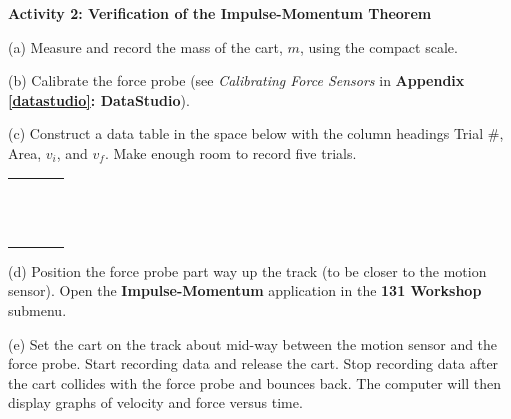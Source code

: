 \vspace{0.3cm}
{\par\centering {} \par}
\vspace{0.3cm}

\textbf{Activity  2: Verification of the Impulse-Momentum Theorem} 

(a) Measure and record the mass of the cart, $m$, using the compact scale.
\vspace{10mm}

(b) Calibrate the force probe (see \textit{Calibrating Force Sensors} in \textbf{Appendix \ref{datastudio}: DataStudio}). 

(c) Construct a data table in the space below with the column headings Trial
\#, Area, \( v_{i} \), and \( v_{f} \). Make enough room to record five trials.

\begin{center}
\begin{tabular}{|p{1.0in}|p{1.0in}|p{1.0in}|p{1.0in}|} \hline
 & & & \\ \hline
 & & & \\
 & & & \\
 & & & \\
 & & & \\
 & & & \\
 & & & \\
 & & & \\
 & & & \\
 & & & \\
 & & & \\
 & & & \\
 & & & \\
 & & & \\ \hline
\end{tabular}
\end{center}

(d) Position the force probe part way up the track (to be closer to the motion sensor). Open the \textbf{Impulse-Momentum} application in the \textbf{131 Workshop} submenu. 

(e) Set the cart on the track about mid-way between the motion sensor and the force probe. Start recording data and release the cart. Stop recording data after the cart collides with the force probe and bounces back. The computer will then display graphs of velocity and force versus time.

